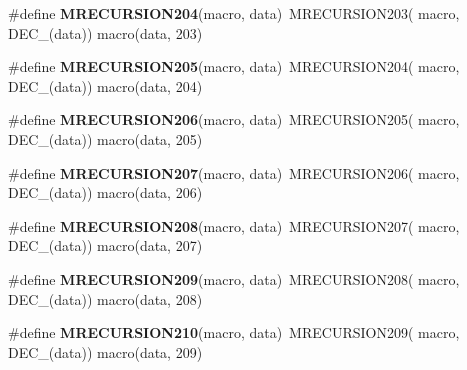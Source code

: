 \begin{DoxyCompactItemize}
\item 
\hypertarget{group__group__sam0__utils__mrecursion_ga194c82ac419aa1f8e626e2e8e9211b01}{}\#define {\bfseries M\+R\+E\+C\+U\+R\+S\+I\+O\+N204}(macro,  data)~M\+R\+E\+C\+U\+R\+S\+I\+O\+N203(  macro, D\+E\+C\+\_\+(data))   macro(data, 203)\label{group__group__sam0__utils__mrecursion_ga194c82ac419aa1f8e626e2e8e9211b01}

\item 
\hypertarget{group__group__sam0__utils__mrecursion_ga0a13dd4989c1ccfadd8c416bd616162a}{}\#define {\bfseries M\+R\+E\+C\+U\+R\+S\+I\+O\+N205}(macro,  data)~M\+R\+E\+C\+U\+R\+S\+I\+O\+N204(  macro, D\+E\+C\+\_\+(data))   macro(data, 204)\label{group__group__sam0__utils__mrecursion_ga0a13dd4989c1ccfadd8c416bd616162a}

\item 
\hypertarget{group__group__sam0__utils__mrecursion_gaabaf99cc947f3217c4a84585f4674b79}{}\#define {\bfseries M\+R\+E\+C\+U\+R\+S\+I\+O\+N206}(macro,  data)~M\+R\+E\+C\+U\+R\+S\+I\+O\+N205(  macro, D\+E\+C\+\_\+(data))   macro(data, 205)\label{group__group__sam0__utils__mrecursion_gaabaf99cc947f3217c4a84585f4674b79}

\item 
\hypertarget{group__group__sam0__utils__mrecursion_ga2c5250a666b28836b1b47a5719e89001}{}\#define {\bfseries M\+R\+E\+C\+U\+R\+S\+I\+O\+N207}(macro,  data)~M\+R\+E\+C\+U\+R\+S\+I\+O\+N206(  macro, D\+E\+C\+\_\+(data))   macro(data, 206)\label{group__group__sam0__utils__mrecursion_ga2c5250a666b28836b1b47a5719e89001}

\item 
\hypertarget{group__group__sam0__utils__mrecursion_ga064aaf5aca80528731a580908f6a5142}{}\#define {\bfseries M\+R\+E\+C\+U\+R\+S\+I\+O\+N208}(macro,  data)~M\+R\+E\+C\+U\+R\+S\+I\+O\+N207(  macro, D\+E\+C\+\_\+(data))   macro(data, 207)\label{group__group__sam0__utils__mrecursion_ga064aaf5aca80528731a580908f6a5142}

\item 
\hypertarget{group__group__sam0__utils__mrecursion_ga414e00269be46274269d32c3441760ff}{}\#define {\bfseries M\+R\+E\+C\+U\+R\+S\+I\+O\+N209}(macro,  data)~M\+R\+E\+C\+U\+R\+S\+I\+O\+N208(  macro, D\+E\+C\+\_\+(data))   macro(data, 208)\label{group__group__sam0__utils__mrecursion_ga414e00269be46274269d32c3441760ff}

\item 
\hypertarget{group__group__sam0__utils__mrecursion_ga70903b9009c4d93b5e6bd6dcd052023f}{}\#define {\bfseries M\+R\+E\+C\+U\+R\+S\+I\+O\+N210}(macro,  data)~M\+R\+E\+C\+U\+R\+S\+I\+O\+N209(  macro, D\+E\+C\+\_\+(data))   macro(data, 209)\label{group__group__sam0__utils__mrecursion_ga70903b9009c4d93b5e6bd6dcd052023f}


\end{DoxyCompactItemize}
